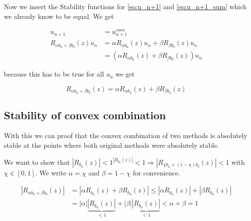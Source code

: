 \documentclass{article}
\begin{document}
Now we insert the Stability functions for \ref{eq:u_n+1} and \ref{eq:u_n+1_sum} which we already know to be equal. We get 

\begin{align}
u_{n+1} &= u_{n+1}^{sum} \\
R_{\alpha b_a+\beta b_b}(z) u_n &= \alpha R_{\alpha b_a}(z) u_n + \beta R_{\beta b_b}(z) u_n \\
&= (\alpha R_{\alpha b_a}(z) + \beta R_{\beta b_b}(z)) u_n
\end{align}

because this has to be true for all $u_n$ we get

\begin{equation}
R_{\alpha b_a+\beta b_b}(z) = \alpha R_{\alpha b_a}(z) + \beta R_{\beta b_b}(z) 
\end{equation}

\subsection{Stability of convex combination}\label{proof:convex_comb}

With this we can proof that the convex combination of two methods is absolutely stable at the points where both original methods were absolutely stable.

We want to show that $|R_{b_a}(z)|  < 1 ^ |R_{b_b}(z)| < 1\Rightarrow |R_{\chi b_a +(1- \chi) b_b}(z)| < 1$ with $\chi \in [0,1]$.
We write $\alpha = \chi$ and $\beta = 1-\chi$ for convenience.

\begin{align}
|R_{\alpha b_a +\beta b_b}(z)| &= |\alpha R_{b_a}(z) + \beta R_{b_a}(z)| \leq |\alpha R_{b_a}(z)| + |\beta R_{b_a}(z)|\\
 &=| \alpha| \underbrace{|R_{b_a}(z)|}_{<1} + |\beta| \underbrace{|R_{b_a}(z)|}_{<1} < \alpha + \beta = 1
\end{align}
\end{document}
